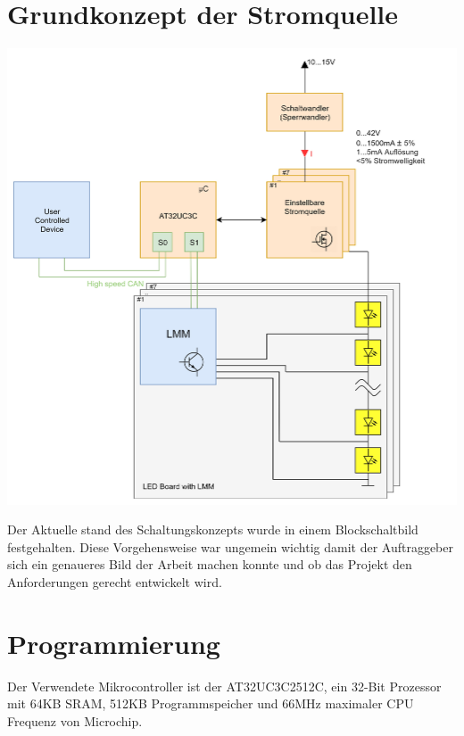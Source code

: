 \documentclass[paper=a4, 12pt]{scrreprt}
\begin{document}
	\section{Grundkonzept der Stromquelle}\hfill \break
	\begin{adjustbox}{center,caption={Grundkonzept der Stromquelle},label={fig:Grundkonzept},nofloat=figure,vspace=\bigskipamount}
		\includegraphics[height=\textwidth]{img/Diplomarbeit_Blockschaltbild.jpg}
		\hfill \break
	\end{adjustbox}
	Der Aktuelle stand des Schaltungskonzepts wurde in einem Blockschaltbild festgehalten.
	Diese Vorgehensweise war ungemein wichtig damit der Auftraggeber sich ein genaueres Bild der Arbeit machen konnte und ob das Projekt den Anforderungen gerecht entwickelt wird.
	\newpage
	
	\section{Programmierung}\hfill \break
	Der Verwendete Mikrocontroller ist der AT32UC3C2512C, ein 32-Bit Prozessor mit 64KB SRAM, 512KB Programmspeicher und 66MHz maximaler CPU Frequenz von Microchip.
	
\end{document}
